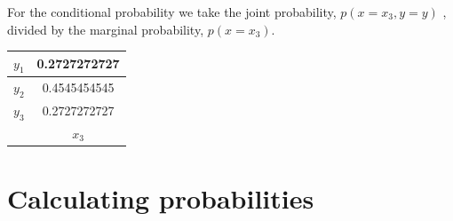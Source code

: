 \documentclass{article}
\begin{document}
\begin{enumerate}
    For the conditional probability we take the joint probability, $p(x = x_{3}, y = y)$ , divided by the marginal probability, $p(x = x_{3})$.
        \begin{center}
            \begin{tabular}{ |c|c| } 
                \hline
                $y_{1}$ & 0.2727272727 \\ 
                \hline
                $y_{2}$ & 0.4545454545 \\
                \hline 
                $y_{3}$ & 0.2727272727 \\ 
                \hline
                & $x_{3}$ \\ 
                \hline
            \end{tabular}
        \end{center}
\end{enumerate}

\section{Calculating probabilities}
\end{document}
